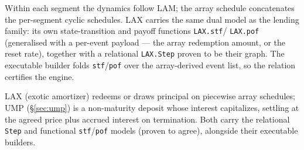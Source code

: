 Within each segment the dynamics follow LAM; the array schedule concatenates the
per-segment cyclic schedules.  LAX carries the same dual model as the lending
family: its own state-transition and payoff functions \texttt{LAX.stf}/%
\texttt{LAX.pof} (generalised with a per-event payload --- the array redemption
amount, or the reset rate), together with a relational \texttt{LAX.Step} proven
to be their graph.  The executable builder folds \texttt{stf}/\texttt{pof} over
the array-derived event list, so the relation certifies the engine.

\begin{definition}[LAXUMP]\label{def:laxump}
        \leanok
        LAX (exotic amortizer) redeems or draws principal on piecewise array schedules; UMP (\S\ref{sec:ump}) is a non-maturity deposit whose interest capitalizes, settling at the agreed price plus accrued interest on termination.  Both carry the relational \texttt{Step} and functional \texttt{stf}/\texttt{pof} models (proven to agree), alongside their executable builders.
\end{definition}

